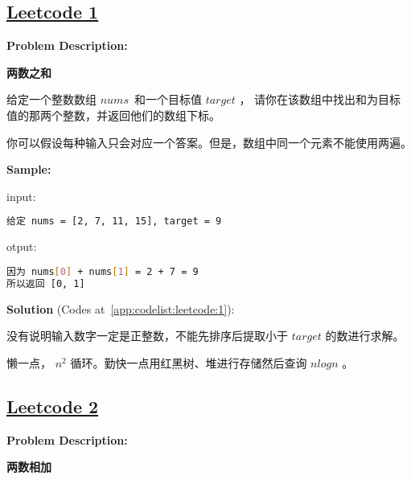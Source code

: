 \subsection{\href{https://leetcode-cn.com/}{Leetcode 1}}\label{app:problemlist:leetcode:1}

\textbf{Problem Description:}\par

\textbf{两数之和}\par

给定一个整数数组 $ nums $ 和一个目标值 $ target $ ，
请你在该数组中找出和为目标值的那两个整数，并返回他们的数组下标。\par

你可以假设每种输入只会对应一个答案。但是，数组中同一个元素不能使用两遍。\par


\textbf{Sample:}\par

input:\par

\begin{lstlisting}[language=bash]
给定 nums = [2, 7, 11, 15], target = 9
\end{lstlisting}

otput:\par

\begin{lstlisting}[language=bash]
因为 nums[0] + nums[1] = 2 + 7 = 9
所以返回 [0, 1]
\end{lstlisting}

\textbf{Solution }(Codes at~\ref{app:codelist:leetcode:1}):\par

没有说明输入数字一定是正整数，不能先排序后提取小于 $ target $ 的数进行求解。\par

懒一点， $ n^{2} $ 循环。勤快一点用红黑树、堆进行存储然后查询 $ nlogn $ 。\par



\subsection{\href{https://leetcode-cn.com/}{Leetcode 2}}\label{app:problemlist:leetcode:2}

\textbf{Problem Description:}\par

\textbf{两数相加}\par

